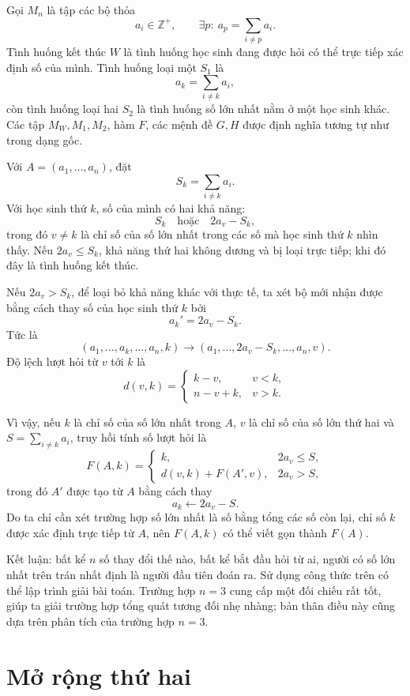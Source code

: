 \documentclass[11pt]{article}
\begin{document}
Gọi \(M_n\) là tập các bộ thỏa
\[
  a_i\in\mathbb Z^+,\qquad
  \exists p:\ a_p=\sum_{i\ne p}a_i.
\]
Tình huống kết thúc \(W\) là tình huống học sinh đang được hỏi có thể trực
tiếp xác định số của mình. Tình huống loại một \(S_1\) là
\[
  a_k=\sum_{i\ne k}a_i,
\]
còn tình huống loại hai \(S_2\) là tình huống số lớn nhất nằm ở một học sinh
khác. Các tập \(M_W,M_1,M_2\), hàm \(F\), các mệnh đề \(G,H\) được định nghĩa
tương tự như trong dạng gốc.

Với \(A=(a_1,\ldots,a_n)\), đặt
\[
  S_k=\sum_{i\ne k}a_i.
\]
Với học sinh thứ \(k\), số của mình có hai khả năng:
\[
  S_k \quad\text{hoặc}\quad
  2a_v-S_k,
\]
trong đó \(v\ne k\) là chỉ số của số lớn nhất trong các số mà học sinh thứ
\(k\) nhìn thấy. Nếu \(2a_v\le S_k\), khả năng thứ hai không dương và bị loại
trực tiếp; khi đó đây là tình huống kết thúc.

Nếu \(2a_v>S_k\), để loại bỏ khả năng khác với thực tế, ta xét bộ mới nhận
được bằng cách thay số của học sinh thứ \(k\) bởi
\[
  a_k'=2a_v-S_k.
\]
Tức là
\[
  (a_1,\ldots,a_k,\ldots,a_n,k)
  \longrightarrow
  (a_1,\ldots,2a_v-S_k,\ldots,a_n,v).
\]
Độ lệch lượt hỏi từ \(v\) tới \(k\) là
\[
  d(v,k)=
  \begin{cases}
    k-v, & v<k,\\
    n-v+k, & v>k.
  \end{cases}
\]

Vì vậy, nếu \(k\) là chỉ số của số lớn nhất trong \(A\), \(v\) là chỉ số của
số lớn thứ hai và \(S=\sum_{i\ne k}a_i\), truy hồi tính số lượt hỏi là
\[
F(A,k)=
\begin{cases}
  k, & 2a_v\le S,\\
  d(v,k)+F(A',v), & 2a_v>S,
\end{cases}
\]
trong đó \(A'\) được tạo từ \(A\) bằng cách thay
\[
  a_k\leftarrow 2a_v-S.
\]
Do ta chỉ cần xét trường hợp số lớn nhất là số bằng tổng các số còn lại, chỉ
số \(k\) được xác định trực tiếp từ \(A\), nên \(F(A,k)\) có thể viết gọn
thành \(F(A)\).

Kết luận: bất kể \(n\) số thay đổi thế nào, bất kể bắt đầu hỏi từ ai, người
có số lớn nhất trên trán nhất định là người đầu tiên đoán ra. Sử dụng công
thức trên có thể lập trình giải bài toán. Trường hợp \(n=3\) cung cấp một đối
chiếu rất tốt, giúp ta giải trường hợp tổng quát tương đối nhẹ nhàng; bản
thân điều này cũng dựa trên phân tích của trường hợp \(n=3\).

\section{Mở rộng thứ hai}
\end{document}
